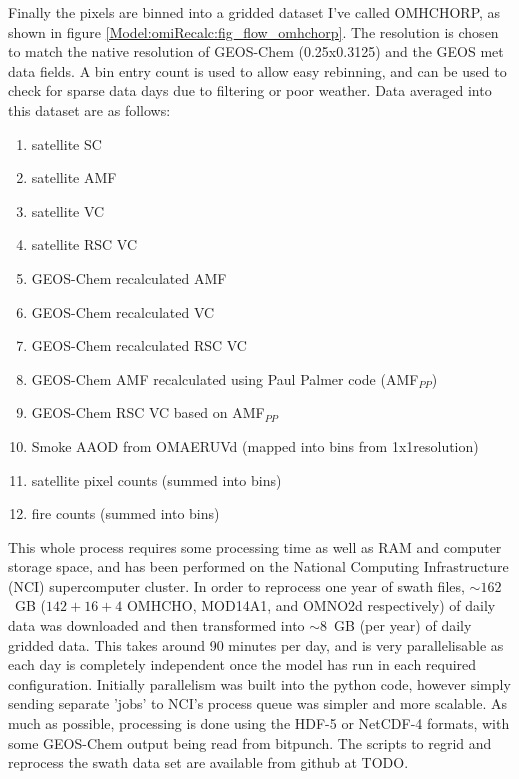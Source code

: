     Finally the pixels are binned into a gridded dataset I've called OMHCHORP, as shown in figure \ref{Model:omiRecalc:fig_flow_omhchorp}.
    The resolution is chosen to match the native resolution of GEOS-Chem (0.25x0.3125\degr) and the GEOS met data fields.
    A bin entry count is used to allow easy rebinning, and can be used to check for sparse data days due to filtering or poor weather.
    Data averaged into this dataset are as follows:
    \begin{enumerate}
      \item satellite SC %
      \item satellite AMF %
      \item satellite VC %
      \item satellite RSC VC %
      \item GEOS-Chem recalculated AMF %
      \item GEOS-Chem recalculated VC %
      \item GEOS-Chem recalculated RSC VC %
      \item GEOS-Chem AMF recalculated using Paul Palmer code (AMF$_{PP}$)
      \item GEOS-Chem RSC VC based on AMF$_{PP}$
      \item Smoke AAOD from OMAERUVd (mapped into bins from 1x1\degr resolution)
      \item satellite pixel counts (summed into bins)
      \item fire counts (summed into bins)
    \end{enumerate}
    
    This whole process requires some processing time as well as RAM and computer storage space, and has been performed on the National Computing Infrastructure (NCI) supercomputer cluster.
    In order to reprocess one year of swath files, $\sim 162$~GB ($142 + 16 + 4$ OMHCHO, MOD14A1, and OMNO2d respectively) of daily data was downloaded and then transformed into $\sim 8$~GB (per year) of daily gridded data.
    This takes around 90 minutes per day, and is very parallelisable as each day is completely independent once the model has run in each required configuration.
    Initially parallelism was built into the python code, however simply sending separate 'jobs' to NCI's process queue was simpler and more scalable.
    As much as possible, processing is done using the HDF-5 or NetCDF-4 formats, with some GEOS-Chem output being read from bitpunch.
    The scripts to regrid and reprocess the swath data set are available from github at TODO.
  
